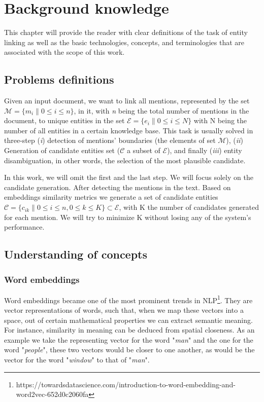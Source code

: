 \chapter{Background knowledge}
\label{ch:ForNot}

This chapter will provide the reader with clear definitions of the task of entity linking as well as the basic technologies, concepts, and terminologies that are associated with the scope of this work.

\section{Problems definitions}
\label{Pbdef}
Given an input document, we want to link all mentions, represented by the set $\mathcal{M}=\{m_{i}\| 0 \leq i \leq n\}$, in it, with \textit{n} being the total number of mentions in the document, to unique entities in the set $\mathcal{E}=\{e_{i} \| 0 \leq i \leq N\}$ with N being the number of all entities in a certain knowledge base. This task is usually solved in three-step (\textit{i}) detection of mentions' boundaries (the elements of set $\mathcal{M}$), (\textit{ii}) Generation of candidate entities set ($\mathcal{C}$ a subset of $\mathcal{E}$), and finally (\textit{iii}) entity disambiguation, in other words, the selection of the most plausible candidate.\cite{Sevgili2020}

In this work, we will omit the first and the last step. We will focus solely on the candidate generation. After detecting the mentions in the text. Based on embeddings similarity metrics we generate a set of candidate entities $\mathcal{C}=\{c_{ik}\| 0 \leq i \leq n, 0 \leq k \leq K\} \subset \mathcal{E}$, with K the number of candidates generated for each mention. We will try to minimize K without losing any of the system's performance.


\section{Understanding of concepts}

\subsection{Word embeddings}
Word embeddings became one of the most prominent trends in NLP\footnote{https://towardsdatascience.com/introduction-to-word-embedding-and-word2vec-652d0c2060fa}. They are vector representations of words, such that, when we map these vectors into a space, out of certain mathematical properties we can extract semantic meaning. For instance, similarity in meaning can be deduced from spatial closeness. As an example we take the representing vector for the word "\textit{man}" and the one for the word "\textit{people}", these two vectors would be closer to one another, as would be the vector for the word "\textit{window}" to that of "\textit{man}".

